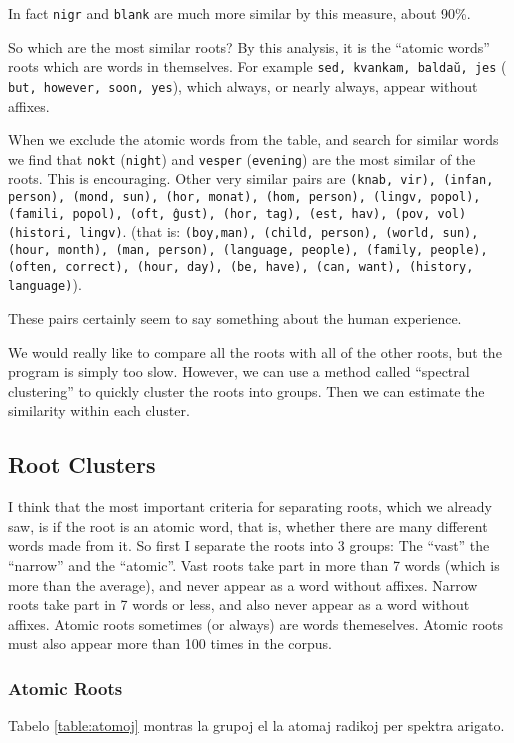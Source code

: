 \documentclass[12pt,twoside]{article}
\begin{document}
In fact \texttt{nigr} and \texttt{blank} are much more similar by this measure, about 90\%.

So which are the most similar roots? By this analysis, it is the ``atomic words'' roots which are words in themselves.
For example  \texttt{sed, kvankam, baldaŭ, jes} ( \texttt{but, however, soon, yes}), which always, or nearly always, appear without affixes. 

When we exclude the atomic words from the table, and search for similar words we find that 
\texttt{nokt} (\texttt{night}) and \texttt{vesper} (\texttt{evening}) are the most similar of the roots. 
This is encouraging. Other very similar pairs are \texttt{(knab, vir), (infan, person), (mond, sun), (hor, monat), (hom, person), (lingv, popol),
(famili, popol), (oft, ĝust), (hor, tag), (est, hav), (pov, vol) (histori, lingv)}.
(that is: \texttt{(boy,man), (child, person), (world, sun), (hour, month), (man, person), (language, people), (family, people), (often, correct), (hour, day),
(be, have), (can, want), (history, language)}).

These pairs certainly seem to say something about the human experience.

We would really like to compare all the roots with all of the other roots, but the program is simply too slow. However, we can use 
a method called ``spectral clustering'' to quickly cluster the roots into groups. Then we can estimate the similarity within each cluster. 

\subsection{Root Clusters}
 
I think that the most important criteria for separating roots, which we already saw, is if the root is an atomic word, that is, whether 
there are many different words made from it. So first I separate the roots into 3 groups: The ``vast'' the ``narrow'' and the ``atomic''.
Vast roots take part in more than 7 words (which is more than the average), and never appear as a word without affixes.
Narrow roots take part in 7 words or less, and also never appear as a word without affixes.
Atomic roots sometimes (or always) are words themeselves. Atomic roots must also appear more than 100 times in the corpus.

\subsubsection{Atomic Roots}
Tabelo \ref{table:atomoj} montras la grupoj el la atomaj radikoj per spektra arigato. 
\end{document}
